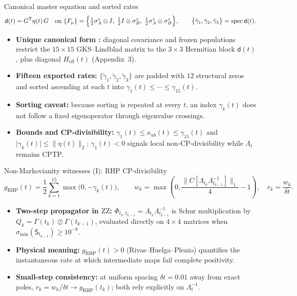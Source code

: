 \documentclass[aspectratio=169,11pt]{beamer}
\newcommand{\spec}{\operatorname{spec}}
\newcommand{\ZZ}{\mathrm{ZZ}}
\newcommand{\dmat}{\mathsf d}
\newcommand{\Heff}{H_{\mathrm{eff}}}
\begin{document}
\begin{frame}{Canonical master equation and sorted rates}
\small
\[
\dmat(t)=G^{\mathsf T}\eta(t)\,G\quad\text{on }\{F_\mu\}=\Bigl\{\tfrac12\sigma_A^z\otimes I,\;\tfrac12 I\otimes\sigma_B^z,\;\tfrac12\sigma_A^z\otimes\sigma_B^z\Bigr\},\qquad
\bigl\{\tilde\gamma_1,\tilde\gamma_2,\tilde\gamma_3\bigr\}=\spec\dmat(t).
\]
\begin{itemize}\setlength\itemsep{4pt}
\item \textbf{Unique canonical form \cite{Hall2014}:} diagonal covariance and frozen populations restrict the $15\times 15$ GKS--Lindblad matrix to the $3\times 3$ Hermitian block $\dmat(t)$, plus diagonal $\Heff(t)$ (Appendix~3).
\item \textbf{Fifteen exported rates:} $\{\tilde\gamma_1,\tilde\gamma_2,\tilde\gamma_3\}$ are padded with $12$ structural zeros and sorted ascending at each $t$ into $\gamma_1(t)\le\cdots\le\gamma_{15}(t)$.
\item \textbf{Sorting caveat:} because sorting is repeated at every $t$, an index $\gamma_k(t)$ does not follow a fixed eigenoperator through eigenvalue crossings.
\item \textbf{Bounds and CP-divisibility:} $\gamma_1(t)\le\kappa_{ab}(t)\le\gamma_{15}(t)$ and $\lvert\gamma_k(t)\rvert\le\lVert\eta(t)\rVert_2$; $\gamma_1(t)<0$ signals local non-CP-divisibility while $\Lambda_t$ remains CPTP.
\end{itemize}
\end{frame}

\begin{frame}{Non-Markovianity witnesses (I): RHP CP-divisibility}
\small
\[
g_{\mathrm{RHP}}(t)=\frac12\sum_{k=1}^{15}\max\bigl(0,-\gamma_k(t)\bigr),\qquad
w_k=\max\!\left(0,\frac{\lVert C[\Lambda_{t_k}\Lambda_{t_{k-1}}^{-1}]\rVert_1}{4}-1\right),\quad
r_k=\frac{w_k}{\delta t}.
\]
\begin{itemize}\setlength\itemsep{5pt}
\item \textbf{Two-step propagator in $\ZZ$:} $\Phi_{t_k,t_{k-1}}=\Lambda_{t_k}\Lambda_{t_{k-1}}^{-1}$ is Schur multiplication by $Q_k=\Gamma(t_k)\oslash\Gamma(t_{k-1})$, evaluated directly on $4\times 4$ matrices when $\sigma_{\min}(\mathsf S_{t_{k-1}})\ge 10^{-8}$.
\item \textbf{Physical meaning:} $g_{\mathrm{RHP}}(t)>0$ (Rivas--Huelga--Plenio) quantifies the instantaneous rate at which intermediate maps fail complete positivity.
\item \textbf{Small-step consistency:} at uniform spacing $\delta t=0.01$ away from exact poles, $r_k=w_k/\delta t\to g_{\mathrm{RHP}}(t_k)$; both rely explicitly on $\Lambda_t^{-1}$.
\end{itemize}
\end{frame}
\end{document}
